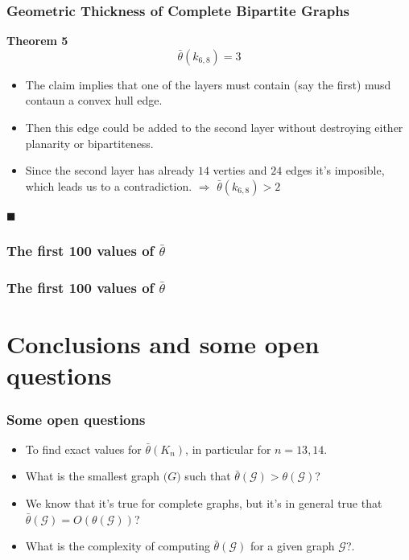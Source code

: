 \documentclass[12 pt]{beamer}
\begin{document}
\begin{frame}{}
    
    \frametitle{Geometric Thickness of Complete Bipartite Graphs}
    
    \begin{block}{\textbf{Theorem 5}}
    $$\bar{\theta} (k_{6,8}) = 3$$
    \end{block}
    
    \begin{itemize}
        \item The claim implies that one of the layers must contain (say the first) musd contaun a convex hull edge.
        \item Then this edge could be added to the second layer without destroying either planarity or bipartiteness.
        \item Since the second layer has already $14$ verties and $24$ edges it's imposible, which leads us to a contradiction. $\Rightarrow$ $\bar{\theta} (k_{6,8}) > 2$
    \end{itemize}
    \begin{flushright}
    $\blacksquare$
    \end{flushright}
\end{frame}

\begin{frame}{}
    \frametitle{The first 100 values of  $\bar{\theta}$}
\end{frame}

\begin{frame}{}
    \frametitle{The first 100 values of  $\bar{\theta}$}
\end{frame}

\section{Conclusions and some open questions}

\begin{frame}{}
    \frametitle{Some open questions}
    
    \begin{itemize}
        \item To find exact values for $\bar{\theta}(K_{n})$, in particular for $n = 13, 14$.
        \item What is the smallest graph $\mathcal(G)$ such that $\bar{\theta}(\mathcal{G}) > \theta(\mathcal{G})$?
        \item We know that it's true for complete graphs, but it's in general true that $\bar{\theta}(\mathcal{G}) = O(\theta(\mathcal{G}))$?
        \item What is the complexity of computing $\bar{\theta}(\mathcal{G})$ for a given graph $\mathcal{G}$?.
    \end{itemize}
    
\end{frame}
\end{document}
